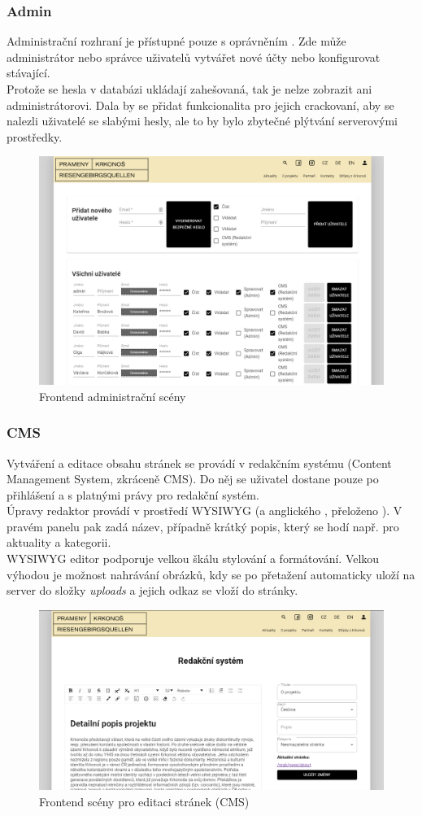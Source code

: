 \subsubsection{Admin}
Administrační rozhraní je přístupné pouze s oprávněním .
Zde může administrátor nebo správce uživatelů vytvářet nové účty nebo
konfigurovat stávající.\\
Protože se hesla v databázi ukládají zahešovaná, tak je nelze zobrazit ani administrátorovi.
Dala by se přidat funkcionalita pro jejich crackovaní, aby se nalezli uživatelé se
slabými hesly, ale to by bylo zbytečné plýtvání serverovými prostředky.
\begin{figure}[H]
	\centering
	\includegraphics[width=.8\linewidth]{img/adminScene.png}
	\caption{Frontend administrační scény}
\end{figure}

\subsubsection{CMS}
Vytváření a editace obsahu stránek se provádí v redakčním systému (Content Management System, zkráceně CMS).
Do něj se uživatel dostane pouze po přihlášení a s platnými právy pro redakční systém.\\
Úpravy redaktor provádí v prostředí WYSIWYG (a anglického , přeloženo ).
V pravém panelu pak zadá název, případně krátký popis, který se hodí např. pro aktuality a kategorii.\\
WYSIWYG editor podporuje velkou škálu stylování a formátování. Velkou výhodou je možnost nahrávání obrázků,
kdy se po přetažení automaticky uloží na server do složky \textit{uploads} a jejich odkaz se vloží do stránky.
\begin{figure}[H]
	\centering
	\includegraphics[width=.8\linewidth]{img/cmsScene.png}
	\caption{Frontend scény pro editaci stránek (CMS)}
\end{figure}

